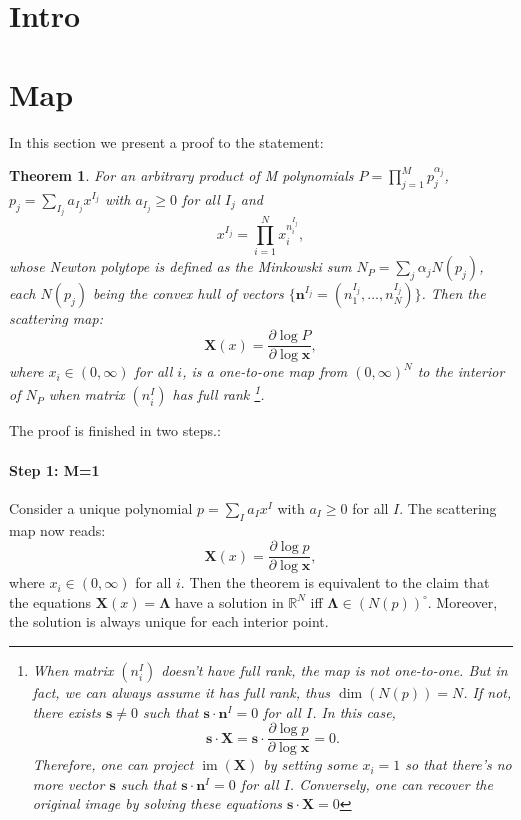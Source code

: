 \documentclass[12pt]{article}
\theoremstyle{definition}
\theoremstyle{plain}
\newtheorem{thm}[para]{Theorem}
\begin{document}
\section{Intro}

\section{Map}

In this section we present a proof to the statement:
\begin{thm}
For an arbitrary product of M polynomials $P=\prod_{j=1}^M p_j^{\alpha_j}$, $p_j=\sum_{I_j} a_{I_j} x^{I_j}$ with $a_{I_j}\geq 0$ for all $I_j$ and
 \[
	x^{I_j}=\prod_{i=1}^N x_i^{n^{I_j}_i},
\]
whose Newton polytope is defined as the Minkowski sum  $N_P=\sum_j \alpha_j N(p_j)$, each $N(p_j)$ being the convex hull of vectors $\{\mathbf{n}^{I_j}=(n^{I_j}_1,\dots,n^{I_j}_N)\}$. Then the scattering map:
\[
	\mathbf X(x)=\frac{\partial \log P}{\partial \log \mathbf x},
\]
where $x_i\in (0,\infty)$ for all $i$, is a one-to-one map from $(0,\infty)^N$ to the interior of $N_P$ when matrix $(n_i^I)$ has full rank
\footnote{When matrix $(n_i^I)$ doesn't have full rank, the map is not one-to-one. But in fact, we can always assume it has full rank, thus $\dim (N(p))=N$. If not, there exists $\mathbf s\neq 0$ such that $\mathbf s \cdot \mathbf n^I=0$ for all $I$. In this case,
\[
	\mathbf s\cdot\mathbf X=\mathbf s\cdot\frac{\partial \log p}{\partial \log \mathbf x}=0.
\]
Therefore, one can project $\operatorname{im}(\mathbf X)$ by setting some $x_i=1$ so that there's no more vector $\mathbf s$ such that $\mathbf s\cdot \mathbf n^I=0$ for all $I$. Conversely, one can recover the original image by solving these equations $\mathbf s\cdot\mathbf X=0$}. 

\end{thm}

The proof is finished in two steps.:
\paragraph{Step 1: M=1}
Consider a unique polynomial $p=\sum_{I} a_I x^I$ with $a_I\geq 0$ for all $I$. The scattering map now reads:
\[
	\mathbf X(x)=\frac{\partial \log p}{\partial \log \mathbf x},
\]
where $x_i\in (0,\infty)$ for all $i$. Then the theorem is equivalent to the claim that the equations $\mathbf X(x)=\mathbf\Lambda$ have a solution in $\mathbb R^N$ iff $\mathbf\Lambda\in (N(p))^\circ$. Moreover, the solution is always unique for each interior point.
\end{document}
